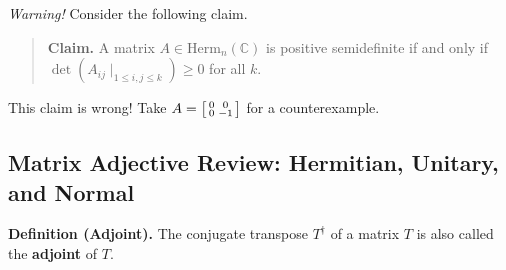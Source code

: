 \textit{\textcolor{red!80}{Warning!}} Consider the following claim.
\begin{quote}
    \textbf{Claim.} A matrix $A \in \mathrm{Herm}_n(\mathbb{C})$ is positive semidefinite if and only if $\det(A_{ij} \mid _{1 \leq i, j \leq k}) \geq 0$ for all $k$.
\end{quote}
This claim is wrong!  Take $A = \begin{bsmallmatrix} 0 & 0 \\ 0 & -1 \end{bsmallmatrix}$ for a counterexample.



\subsection{Matrix Adjective Review: Hermitian, Unitary, and Normal}





\textbf{Definition (Adjoint).} The conjugate transpose $T^{\dagger}$ of a matrix $T$ is also called the \textbf{adjoint} of $T$.

